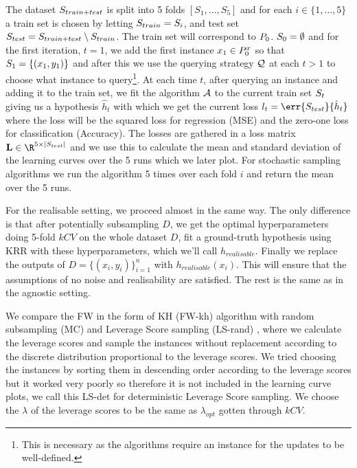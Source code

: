 The dataset \(S_{train+test}\) is split into 5 folds \([S_1, \dots,
S_5]\) and for each \(i \in \{1, \dots, 5\}\) a train set
is chosen by letting \(S_{train} = S_i\), and test set
\(S_{test} = S_{train+test} \setminus S_{train}\). The
train set will correspond to \(P_{0}\). \(S_{0} =
\emptyset\) and for the first iteration, \(t=1\), we add the first instance
\(x_{1} \in P^x_{0}\) so that \(S_{1} = \{(x_{1}, y_{1})\}\) and
after this we use the querying strategy \(\mathcal{Q}\) at each \(t > 1\) to
choose what instance to query\footnote{This is necessary as the algorithms
  require an instance for the updates to be well-defined.}. At each time \(t\),
after querying an instance and adding it to the train set, we fit the algorithm \(\mathcal{A}\) to the current train
set \(S_{t}\) giving us a hypothesis \(\hat{h}_{t}\) with which we get
the current loss \(l_{t} = \err{\trainset_{test}}{\hat{h}_{t}}\) where the loss
will be the squared loss for regression (MSE) and the zero-one loss for
classification (Accuracy). The losses are gathered in a loss matrix \(\mat{L}
\in \R^{5 \times |S_{test}|}\) and we use this to calculate the mean and
standard deviation of the learning curves over the 5 runs which we later plot.
For stochastic sampling algorithms we run the algorithm 5 times over each fold
\(i\) and return the mean over the 5 runs.

For the realisable setting, we proceed almost in the same way. The only
difference is that after potentially subsampling \(D\), we get the optimal
hyperparameters doing 5-fold \(kCV\) on the whole dataset \(D\), fit a ground-truth
hypothesis using KRR with these hyperparameters, which we'll call
\(h_{realisable}\). Finally we replace the outputs of \(D = \{(x_i,
y_i)\}_{i=1}^n\) with \(h_{realisable}(x_i)\). This will ensure that the
assumptions of no noise and realisability are satisfied. The rest is the same as
in the agnostic setting.

We compare the FW in the form of KH (FW-kh) algorithm with
random subsampling (MC) and Leverage Score sampling (LS-rand) \citep{rudi18}, where we
calculate the leverage scores and sample the instances without replacement
according to the discrete
distribution proportional to the
leverage scores. We tried choosing the instances by sorting them in descending
order according to the leverage scores but it worked very poorly so therefore it
is not included in the learning curve plots, we call this LS-det for
deterministic Leverage Score sampling. We choose the \(\lambda\) of the
leverage scores to be the same as
\(\lambda_{opt}\) gotten through
\(kCV\). 

